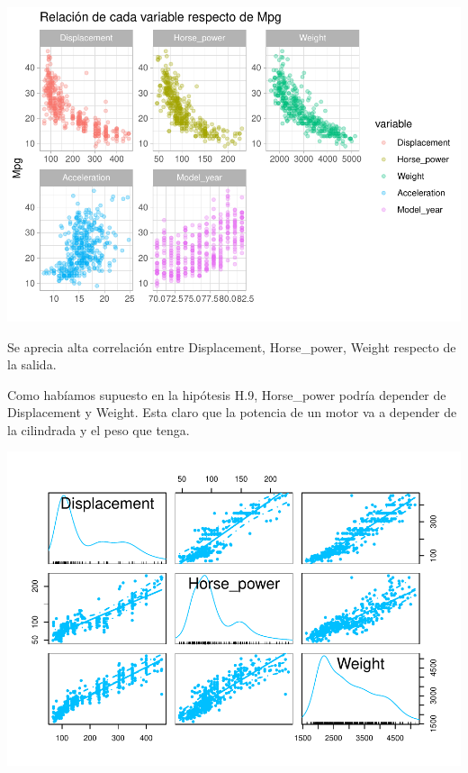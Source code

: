 \documentclass[
]{article}
\newenvironment{Shaded}{\begin{snugshade}}{\end{snugshade}}
\newcommand{\DataTypeTok}[1]{\textcolor[rgb]{0.13,0.29,0.53}{#1}}
\newcommand{\DecValTok}[1]{\textcolor[rgb]{0.00,0.00,0.81}{#1}}
\newcommand{\KeywordTok}[1]{\textcolor[rgb]{0.13,0.29,0.53}{\textbf{#1}}}
\newcommand{\NormalTok}[1]{#1}
\newcommand{\OperatorTok}[1]{\textcolor[rgb]{0.81,0.36,0.00}{\textbf{#1}}}
\newcommand{\StringTok}[1]{\textcolor[rgb]{0.31,0.60,0.02}{#1}}
\begin{document}
\begin{center}\includegraphics{EDA_files/figure-latex/unnamed-chunk-23-1} \end{center}

Se aprecia alta correlación entre Displacement, Horse\_power, Weight
respecto de la salida.

Como habíamos supuesto en la hipótesis H.9, Horse\_power podría depender
de Displacement y Weight. Esta claro que la potencia de un motor va a
depender de la cilindrada y el peso que tenga.

\begin{Shaded}
\end{Shaded}

\begin{center}\includegraphics{EDA_files/figure-latex/unnamed-chunk-24-1} \end{center}
\end{document}
